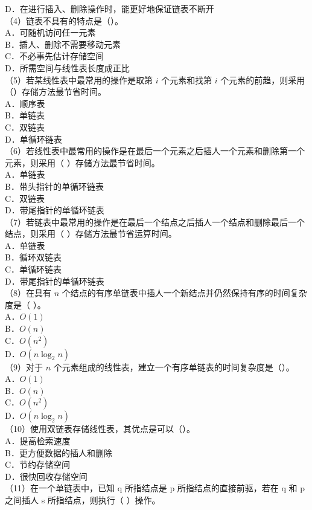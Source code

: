 \documentclass[10pt]{article}
\begin{document}
D．在进行插入、删除操作时，能更好地保证链表不断开\\
（4）链表不具有的特点是（）。\\
A．可随机访问任一元素\\
B．插人、删除不需要移动元素\\
C．不必事先估计存储空间\\
D．所需空间与线性表长度成正比\\
（5）若某线性表中最常用的操作是取第 $i$ 个元素和找第 $i$ 个元素的前趋，则采用（）存储方法最节省时间。\\
A．顺序表\\
B．单链表\\
C．双链表\\
D．单循环链表\\
（6）若线性表中最常用的操作是在最后一个元素之后插人一个元素和删除第一个元素，则采用（ ）存储方法最节省时间。\\
A．单链表\\
B．带头指针的单循环链表\\
C．双链表\\
D．带尾指针的单循环链表\\
（7）若链表中最常用的操作是在最后一个结点之后插人一个结点和删除最后一个结点，则采用（ ）存储方法最节省运算时间。\\
A．单链表\\
B．循环双链表\\
C．单循环链表\\
D．带尾指针的单循环链表\\
（8）在具有 $n$ 个结点的有序单链表中插人一个新结点并仍然保持有序的时间复杂度是（ ）。\\
A．$O(1)$\\
B．$O(n)$\\
C．$O\left(n^{2}\right)$\\
D．$O\left(n \log _{2} n\right)$\\
（9）对于 $n$ 个元素组成的线性表，建立一个有序单链表的时间复杂度是（）。\\
A．$O(1)$\\
B．$O(n)$\\
C．$O\left(n^{2}\right)$\\
D．$O\left(n \log _{2} n\right)$\\
（10）使用双链表存储线性表，其优点是可以（）。\\
A．提高检索速度\\
B．更方便数据的插人和删除\\
C．节约存储空间\\
D．很快回收存储空间\\
（11）在一个单链表中，已知 q 所指结点是 p 所指结点的直接前驱，若在 q 和 p 之间插人 s 所指结点，则执行（ ）操作。
\end{document}
